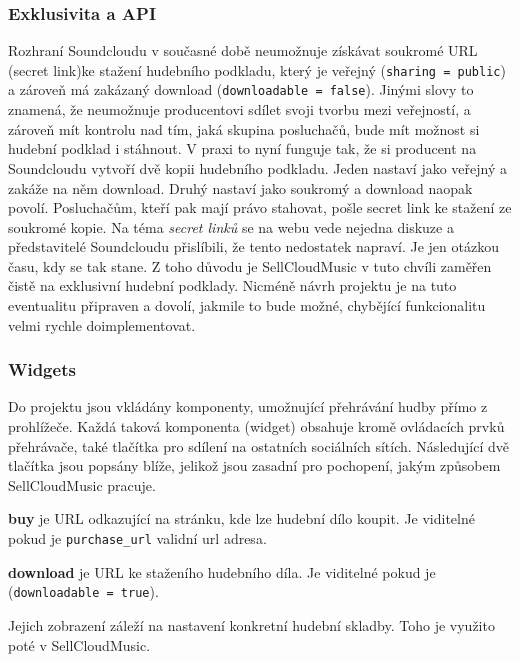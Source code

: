 \documentclass[12pt]{article}
\begin{document}
\subsubsection{Exklusivita a API} \label{exclusivity}

Rozhraní Soundcloudu v současné době neumožnuje získávat soukromé URL (secret link)ke stažení hudebního podkladu, který je veřejný (\texttt{sharing = public}) a zároveň má zakázaný download (\texttt{downloadable = false}). Jinými slovy to znamená, že neumožnuje producentovi sdílet svoji tvorbu mezi veřejností, a zároveň mít kontrolu nad tím, jaká skupina posluchačů, bude mít možnost si hudební podklad i stáhnout. V praxi to nyní funguje tak, že si producent na Soundcloudu vytvoří dvě kopii hudebního podkladu. Jeden nastaví jako veřejný a zakáže na něm download. Druhý nastaví jako soukromý a download naopak povolí. Posluchačům, kteří pak mají právo stahovat, pošle secret link ke stažení ze soukromé kopie.
Na téma \emph{secret linků} se na webu vede nejedna diskuze a představitelé Soundcloudu přislíbili, že tento nedostatek napraví. Je jen otázkou času, kdy se tak stane.
Z toho důvodu je SellCloudMusic v tuto chvíli zaměřen čistě na exklusivní hudební podklady. Nicméně návrh projektu je na tuto eventualitu připraven a dovolí, jakmile to bude možné, chybějící funkcionalitu velmi rychle doimplementovat.

\subsubsection{Widgets} \label{widget}
Do projektu jsou vkládány komponenty, umožnující přehrávání hudby přímo z prohlížeče. Každá taková komponenta (widget) obsahuje kromě ovládacích prvků přehrávače, také tlačítka pro sdílení na ostatních sociálních sítích. Následující dvě tlačítka jsou popsány blíže, jelikož jsou zasadní pro pochopení, jakým způsobem SellCloudMusic pracuje.

\begin{description}
\item{\textbf{buy}} je URL odkazující na stránku, kde lze hudební dílo koupit. Je viditelné pokud je \texttt{purchase\_url} validní url adresa.
\item{\textbf{download}} je URL ke staženího hudebního díla. Je viditelné pokud je (\texttt{downloadable = true}).
\end{description}

Jejich zobrazení záleží na nastavení konkretní hudební skladby. Toho je využito poté v SellCloudMusic.
\end{document}

